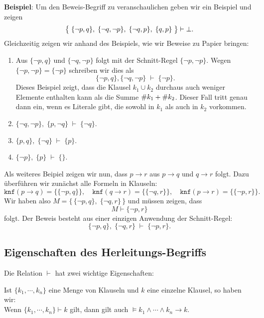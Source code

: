 \noindent
\textbf{Beispiel}:  Um den Beweis-Begriff zu veranschaulichen geben wir ein Beispiel und
zeigen 
\[ \bigl\{\; \{\neg p, q\},\; \{ \neg q, \neg p \},\; \{ \neg q, p \},\; \{ q, p \}\; \bigr\} \vdash \bot.
\]
Gleichzeitig zeigen wir anhand des Beispiels, wie wir Beweise zu Papier bringen:
\begin{enumerate}
\item Aus $\{\neg p, q \}$ und $\{ \neg q, \neg p \}$ folgt mit der Schnitt-Regel   
      $\{ \neg p, \neg p \}$.   Wegen $\{ \neg p, \neg p \} = \{ \neg p \}$
      schreiben wir dies als 
      \[ \{\neg p, q \}, \{ \neg q, \neg p \} \;\vdash\; \{ \neg p \}. \]
      Dieses Beispiel zeigt, dass die Klausel $k_1 \cup k_2$ durchaus auch weniger
      Elemente enthalten kann als die Summe $\symbol{35}k_1 + \symbol{35}k_2$.  Dieser
      Fall tritt genau dann ein, wenn es Literale gibt, die sowohl in $k_1$ als auch in
      $k_2$ vorkommen.
\item $\{\neg q, \neg p \},\; \{ p, \neg q \} \;\vdash\; \{ \neg q \}$. 
\item $\{ p, q \},\; \{ \neg q \} \;\vdash\; \{ p \}$. 
\item $\{ \neg p \},\; \{ p \} \;\vdash\; \{\}$. 
\end{enumerate}
Als weiteres Beipiel zeigen wir nun, dass $p \rightarrow r$ aus $p \rightarrow q$ und $q \rightarrow r$ 
folgt.  Dazu \"{u}berf\"{u}hren wir zun\"{a}chst alle Formeln in Klauseln: 
\[ \texttt{knf}(p \rightarrow q) = \bigl\{ \{ \neg p, q \} \bigr\}, \quad
   \texttt{knf}(q \rightarrow r) = \bigl\{ \{ \neg q, r \} \bigr\}, \quad 
   \texttt{knf}(p \rightarrow r) = \bigl\{ \{ \neg p, r \} \bigr\}.
\]
Wir haben also $M = \bigl\{\, \{ \neg p, q \},\; \{ \neg q, r \}\,\bigr\}$ und m\"{u}ssen zeigen, dass
\[ M \vdash  \{ \neg p, r \} \]
folgt.  Der Beweis besteht aus einer einzigen Anwendung der Schnitt-Regel: 
\[ \{ \neg p, q \},\; \{ \neg q, r \} \;\vdash\; \{ \neg p, r \}. \]

\subsection{Eigenschaften des Herleitungs-Begriffs}
Die Relation $\vdash$ hat zwei wichtige Eigenschaften:

\begin{Satz}
  Ist $\{k_1, \cdots, k_n \}$ eine Menge von Klauseln und $k$ eine einzelne Klausel,
  so haben wir: \\[0.2cm]
  \hspace*{3.3cm} Wenn $\{k_1, \cdots, k_n \} \vdash k$ gilt, dann gilt auch $\models k_1 \wedge \cdots \wedge k_n \rightarrow k$.  
\end{Satz}

